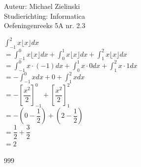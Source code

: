 \documentclass[a4paper]{article}
\begin{document}
  
\noindent \large Auteur: Michael Zielinski \\
\noindent \large Studierichting: Informatica\\
\noindent \large Oefeningenreeks 5A nr. 2.3\\

\medskip

\normalsize

$ \displaystyle\int^2_{-1} x \lfloor x \rfloor dx $ \\

$ = \displaystyle\int^0_{-1} x \lfloor x \rfloor dx + \displaystyle\int^1_0 x \lfloor x \rfloor dx + \displaystyle\int^2_1 x \lfloor x \rfloor dx $ \\

$ = \displaystyle\int^0_{-1} x \cdot (-1) dx + \displaystyle\int^1_0 x \cdot 0 dx + \displaystyle\int^2_1 x \cdot 1 dx $ \\

$ = -\displaystyle\int^0_{-1} x dx + 0 + \displaystyle\int^2_1 x dx $ \\

$ = -\left[ \dfrac{x^2}{2} \right]^0_{-1} + \left[ \dfrac{x^2}{2} \right]^2_1 $ \\

$ = -\left( 0 - \dfrac{1}{2} \right) + \left( 2 - \dfrac{1}{2} \right) $ \\

$ = \dfrac{1}{2} + \dfrac{3}{2} $ \\

$ = 2 $ \\



\begin{thebibliography}{999}
\end{thebibliography}
\end{document}
